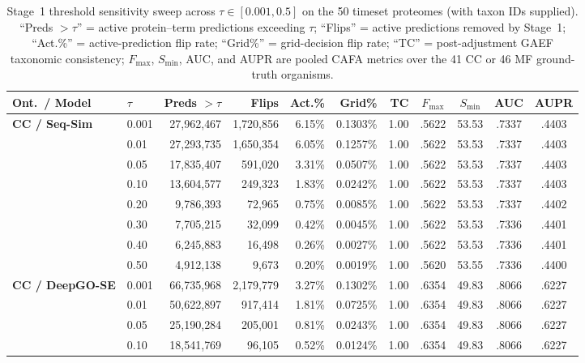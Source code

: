\begin{table}[!h]
\centering
\caption{Stage~1 threshold sensitivity sweep across $\tau \in [0.001, 0.5]$ on the 50 timeset proteomes (with taxon IDs supplied). ``Preds $> \tau$'' = active protein--term predictions exceeding $\tau$; ``Flips'' = active predictions removed by Stage~1; ``Act.\%'' = active-prediction flip rate; ``Grid\%'' = grid-decision flip rate; ``TC'' = post-adjustment GAEF taxonomic consistency; $F_{\max}$, $S_{\min}$, AUC, and AUPR are pooled CAFA metrics over the 41 CC or 46 MF ground-truth organisms.}
\label{tab:supp-tau-sweep}
\scriptsize
\setlength{\tabcolsep}{3.2pt}
\renewcommand{\arraystretch}{0.92}
\begin{tabular}{ll rrrr r cccc}
\toprule
Ont.\ / Model & $\tau$ & Preds $>\tau$ & Flips & Act.\% & Grid\% & TC & $F_{\max}$ & $S_{\min}$ & AUC & AUPR \\
\midrule
\textbf{CC / Seq-Sim}
 & 0.001 & 27{,}962{,}467 & 1{,}720{,}856 & 6.15\% & 0.1303\% & 1.00 & .5622 & 53.53 & .7337 & .4403 \\
 & 0.01  & 27{,}293{,}735 & 1{,}650{,}354 & 6.05\% & 0.1257\% & 1.00 & .5622 & 53.53 & .7337 & .4403 \\
 & 0.05  & 17{,}835{,}407 &   591{,}020 & 3.31\% & 0.0507\% & 1.00 & .5622 & 53.53 & .7337 & .4403 \\
 & 0.10  & 13{,}604{,}577 &   249{,}323 & 1.83\% & 0.0242\% & 1.00 & .5622 & 53.53 & .7337 & .4403 \\
 & 0.20  &  9{,}786{,}393 &    72{,}965 & 0.75\% & 0.0085\% & 1.00 & .5622 & 53.53 & .7337 & .4402 \\
 & 0.30  &  7{,}705{,}215 &    32{,}099 & 0.42\% & 0.0045\% & 1.00 & .5622 & 53.53 & .7336 & .4401 \\
 & 0.40  &  6{,}245{,}883 &    16{,}498 & 0.26\% & 0.0027\% & 1.00 & .5622 & 53.53 & .7336 & .4401 \\
 & 0.50  &  4{,}912{,}138 &     9{,}673 & 0.20\% & 0.0019\% & 1.00 & .5620 & 53.55 & .7336 & .4400 \\
\addlinespace[2pt]
\textbf{CC / DeepGO-SE}
 & 0.001 & 66{,}735{,}968 & 2{,}179{,}779 & 3.27\% & 0.1302\% & 1.00 & .6354 & 49.83 & .8066 & .6227 \\
 & 0.01  & 50{,}622{,}897 &   917{,}414 & 1.81\% & 0.0725\% & 1.00 & .6354 & 49.83 & .8066 & .6227 \\
 & 0.05  & 25{,}190{,}284 &   205{,}001 & 0.81\% & 0.0243\% & 1.00 & .6354 & 49.83 & .8066 & .6227 \\
 & 0.10  & 18{,}541{,}769 &    96{,}105 & 0.52\% & 0.0124\% & 1.00 & .6354 & 49.83 & .8066 & .6227 \\

\end{tabular}
\end{table}

